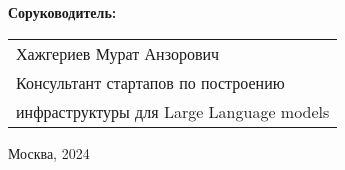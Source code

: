 \begin{titlepage}
\vspace{1em}
{\bf Соруководитель: \vspace{2mm}}%

{
\begin{tabular}{l}
Хажгериев Мурат Анзорович\\
Консультант стартапов по построению\\
инфраструктуры для Large Language models
\end{tabular}}



\vspace{\fill}

\begin{center}
Москва, 2024
\end{center}

\end{titlepage}